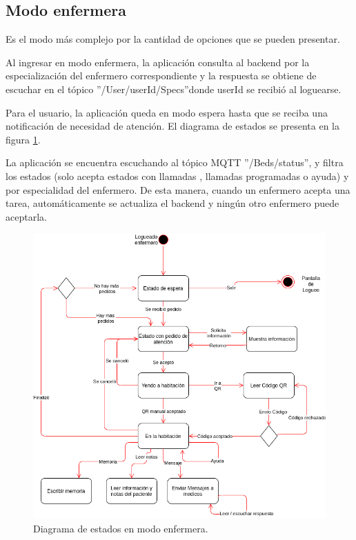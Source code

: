 \pagebreak
\subsection{Modo enfermera}

Es el modo más complejo por la cantidad de opciones que se pueden presentar.

Al ingresar en modo enfermera, la aplicación consulta al backend por la especialización del enfermero correspondiente y la respuesta se obtiene de escuchar en el tópico ''/User/userId/Specs''donde userId se recibió al loguearse.

Para el usuario, la aplicación queda en modo espera hasta que se reciba una notificación de necesidad de atención. El diagrama de estados se presenta en la figura \ref{fig: Diagrama de estados en modo enfermera.}.

 

La aplicación se encuentra escuchando al tópico MQTT ''/Beds/status'', y filtra los estados (solo acepta estados con llamadas , llamadas programadas o ayuda) y por especialidad del enfermero. De esta manera, cuando un enfermero acepta una tarea, automáticamente se actualiza el backend y ningún otro enfermero puede aceptarla.



\begin{figure}[ht]
	\centering
	\includegraphics[scale=.60]{./Figures/app/estados-enf.png}
	\caption{ Diagrama de estados en modo enfermera.}
	\label{fig: Diagrama de estados en modo enfermera.}
\end{figure} 



